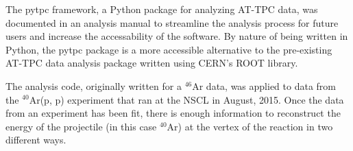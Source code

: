 \documentclass[a0paper,portrait]{baposter}
\begin{document}
\begin{poster}
{{The pytpc framework, a Python package for analyzing AT-TPC data, was documented in an analysis manual to streamline the analysis process for future users and increase the accessability of the software. By nature of being written in Python, the pytpc package is a more accessible alternative to the pre-existing AT-TPC data analysis package written using CERN's ROOT library. }
}
{\small{The analysis code, originally written for a $^{46}$Ar data, was applied to data from the $^{40}$Ar(p, p) experiment that ran at the NSCL in August,  2015. Once the data from an experiment has been fit, there is enough information to reconstruct the energy of the projectile (in this case $^{40}$Ar) at the vertex of the reaction in two different ways.}

}
\end{poster}
\end{document}
